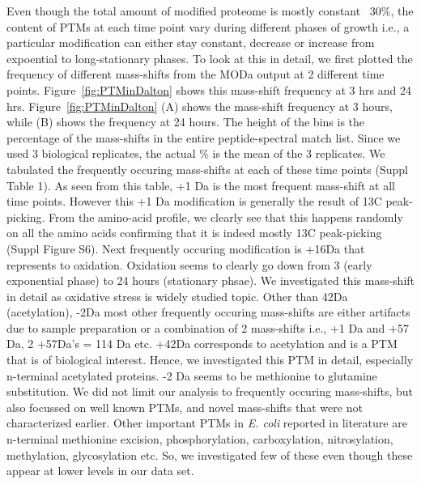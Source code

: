 \documentclass[12pt]{article}
\begin{document}
Even though the total amount of modified proteome is mostly constant ~30\%, the content of PTMs at each time point vary during different phases of growth i.e., a particular modification can either stay constant, decrease or increase from expoential to long-stationary phases. To look at this in detail, we first plotted the frequency of different mass-shifts from the MODa output at 2 different time points. Figure~\ref{fig:PTMinDalton} shows this mass-shift frequency at 3 hrs and 24 hrs. Figure~\ref{fig:PTMinDalton} (A) shows the mass-shift frequency at 3 hours, while (B) shows the frequency at 24 hours. The height of the bins is the percentage of the mass-shifts in the entire peptide-spectral match list. Since we used 3 biological replicates, the actual \% is the mean of the 3 replicates. We tabulated the frequently occuring mass-shifts at each of these time points (Suppl Table 1). As seen from this table, +1 Da is the most frequent mass-shift at all time points. However this +1 Da modification is generally the result of 13C peak-picking. From the amino-acid profile, we clearly see that this happens randomly on all the amino acids confirming that it is indeed mostly 13C peak-picking (Suppl Figure S6). Next frequently occuring modification is +16Da that represents to oxidation. Oxidation seems to clearly go down from 3 (early exponential phase) to 24 hours (stationary phsae). We investigated this mass-shift in detail as oxidative stress is widely studied topic. Other than 42Da (acetylation), -2Da most other frequently occuring mass-shifts are either artifacts due to sample preparation or a combination of 2 mass-shifts i.e., +1 Da and +57 Da, 2 +57Da's = 114 Da etc. +42Da corresponds to acetylation and is a PTM that is of biological interest. Hence, we investigated this PTM in detail, especially n-terminal acetylated proteins. -2 Da seems to be methionine to glutamine substitution. We did not limit our analysis to frequently occuring mass-shifts, but also focussed on well known PTMs, and novel mass-shifts that were not characterized earlier. Other important PTMs in \emph{E. coli} reported in literature are n-terminal methionine excision, phosphorylation, carboxylation, nitrosylation, methylation, glycosylation etc. So, we investigated few of these even though these appear at lower levels in our data set.


\end{document}
